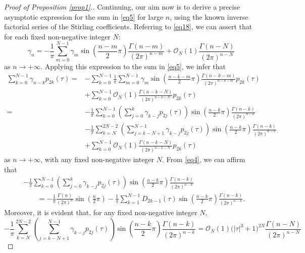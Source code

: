 \begin{proof}[Proof of Proposition \ref{prop1}.]
Continuing, our aim now is to derive a precise asymptotic expression for the sum in \eqref{eq5} for large $n$, using the known inverse factorial series of the Stirling coefficients. Referring to \eqref{eq18}, we can assert that for each fixed non-negative integer $N$:
\[
\gamma _n = -\frac{1}{\pi}\sum_{m = 0}^{N- 1} \gamma _m \sin\left( \frac{n - m}{2}\pi \right)\frac{\Gamma (n - m)}{(2\pi )^{n - m}} + \mathcal{O}_N(1) \frac{\Gamma (n - N)}{(2\pi )^{n - N} }
\]
as $n\to+\infty$. Applying this expression to the sum in \eqref{eq5}, we infer that
\begin{align*}
\sum_{k = 0}^{N - 1} \gamma _{n - k} p_{2k} (\tau ) = & -\sum_{k = 0}^{N - 1} \frac{1}{\pi}\sum_{m = 0}^{N - 1} \gamma _m \sin \left( \frac{n - k - m}{2}\pi \right)\frac{\Gamma (n - k - m)}{(2\pi )^{n - k - m} } p_{2k} (\tau ) \\ & + \sum_{k = 0}^{N - 1} \mathcal{O}_N(1) \frac{\Gamma (n - k - N)}{(2\pi )^{n - k - N} }p_{2k} (\tau )
\\ = &-\frac{1}{\pi }\sum_{k = 0}^{N - 1} \left( \sum_{j = 0}^k \gamma _{k - j} p_{2j} (\tau ) \right)\sin \left( \frac{n - k}{2}\pi \right)\frac{\Gamma (n - k)}{(2\pi )^{n - k} } \\ &- \frac{1}{\pi }\sum_{k = N}^{2N- 2} \left( \sum_{j = k - N + 1}^{N-1} \gamma _{k - j} p_{2j} (\tau ) \right)\sin \left( \frac{n - k}{2}\pi\right)\frac{\Gamma (n - k)}{(2\pi )^{n - k}}
\\ & + \sum_{k = 0}^{N - 1} \mathcal{O}_N(1) \frac{\Gamma (n - k - N)}{(2\pi )^{n - k - N} }p_{2k} (\tau )
\end{align*}
as $n\to+\infty$, with any fixed non-negative integer $N$. From \eqref{eq4}, we can affirm that
\begin{align*}
&-\frac{1}{\pi }\sum_{k = 0}^{N - 1} \left( \sum_{j = 0}^k \gamma _{k - j} p_{2j} (\tau ) \right)\sin \left( \frac{n - k}{2}\pi \right)\frac{\Gamma (n - k)}{(2\pi )^{n - k} } \\ &\qquad= -\frac{1}{\pi}\frac{\Gamma (n)}{(2\pi )^n } \sin \left( \frac{n}{2}\pi \right)-\frac{1}{\pi}\sum_{k = 1}^{N - 1} D_{2k - 1} (\tau )\sin \left( \frac{n - k}{2}\pi \right)\frac{\Gamma (n - k)}{(2\pi )^{n - k}}.
\end{align*}
Moreover, it is evident that, for any fixed non-negative integer $N$,
\[
- \frac{1}{\pi }\sum_{k = N}^{2N-2} \left( \sum_{j = k - N + 1}^{N-1} \gamma _{k - j} p_{2j} (\tau ) \right)\sin \left( \frac{n - k}{2}\pi\right)\frac{\Gamma (n - k)}{(2\pi )^{n - k}}= \mathcal{O}_N (1)\bigl(\left| \tau \right|^3 + 1\bigr)^{2N} \frac{\Gamma (n - N)}{(2\pi )^{n - N}}
\]
\end{proof}
